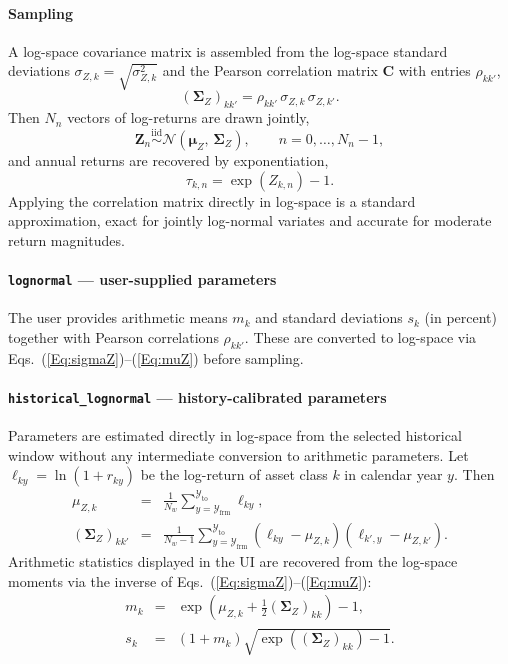 \documentclass[fleqn,12pt]{report}
\begin{document}
\paragraph*{Sampling}
A log-space covariance matrix is assembled from the log-space standard
deviations $\sigma_{Z,k} = \sqrt{\sigma_{Z,k}^2}$ and the Pearson
correlation matrix $\mathbf{C}$ with entries $\rho_{kk'}$,
\begin{equation}
    (\bm{\Sigma}_Z)_{kk'} = \rho_{kk'}\,\sigma_{Z,k}\,\sigma_{Z,k'}.
\end{equation}
Then $N_n$ vectors of log-returns are drawn jointly,
\begin{equation}
    \bm{Z}_n \overset{\mathrm{iid}}{\sim}
    \mathcal{N}(\bm{\mu}_Z,\,\bm{\Sigma}_Z),
    \qquad n = 0, \ldots, N_n - 1,
\end{equation}
and annual returns are recovered by exponentiation,
\begin{equation}
    \tau_{k,n} = \exp(Z_{k,n}) - 1.
\end{equation}
Applying the correlation matrix directly in log-space is a standard
approximation, exact for jointly log-normal variates and accurate
for moderate return magnitudes.

\paragraph*{\texttt{lognormal} --- user-supplied parameters}
The user provides arithmetic means $m_k$ and standard deviations $s_k$
(in percent) together with Pearson correlations $\rho_{kk'}$.
These are converted to log-space via
Eqs.~(\ref{Eq:sigmaZ})--(\ref{Eq:muZ}) before sampling.

\paragraph*{\texttt{historical\_lognormal} --- history-calibrated parameters}
Parameters are estimated directly in log-space from the selected
historical window without any intermediate conversion to arithmetic
parameters.
Let $\ell_{ky} = \ln(1 + r_{ky})$ be the log-return of asset class $k$
in calendar year $y$.  Then
\begin{eqnarray}
    \mu_{Z,k} &=& \frac{1}{N_w}
                  \sum_{y=\mathcal{Y}_{\mathrm{frm}}}^{\mathcal{Y}_{\mathrm{to}}}
                  \ell_{ky},
    \\
    (\bm{\Sigma}_Z)_{kk'} &=& \frac{1}{N_w-1}
                  \sum_{y=\mathcal{Y}_{\mathrm{frm}}}^{\mathcal{Y}_{\mathrm{to}}}
                  (\ell_{ky} - \mu_{Z,k})(\ell_{k',y} - \mu_{Z,k'}).
\end{eqnarray}
Arithmetic statistics displayed in the UI are recovered from the
log-space moments via the inverse of
Eqs.~(\ref{Eq:sigmaZ})--(\ref{Eq:muZ}):
\begin{eqnarray}
    m_k &=& \exp\!\left(\mu_{Z,k} + \tfrac{1}{2}(\bm{\Sigma}_Z)_{kk}\right) - 1,
    \\
    s_k &=& (1 + m_k)\sqrt{\exp\!\left((\bm{\Sigma}_Z)_{kk}\right) - 1}.
\end{eqnarray}
\end{document}
